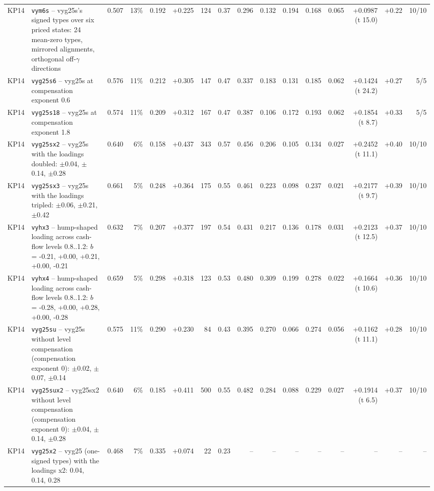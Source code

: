 \begin{landscape}
\begin{longtable}{lp{4.6cm}rrrrrrrrrrrrrr}
KP14 & \texttt{vym6s} -- vyg25s's signed types over six priced states: 24 mean-zero types, mirrored alignments, orthogonal off-$\gamma$ directions & 0.507 & 13\% & 0.192 & +0.225 & 124 & 0.37 & 0.296 & 0.132 & 0.194 & 0.168 & 0.065 & +0.0987 (t 15.0) & +0.22 & 10/10 \\
KP14 & \texttt{vyg25s6} -- vyg25s at compensation exponent 0.6 & 0.576 & 11\% & 0.212 & +0.305 & 147 & 0.47 & 0.337 & 0.183 & 0.131 & 0.185 & 0.062 & +0.1424 (t 24.2) & +0.27 & 5/5 \\
KP14 & \texttt{vyg25s18} -- vyg25s at compensation exponent 1.8 & 0.574 & 11\% & 0.209 & +0.312 & 167 & 0.47 & 0.387 & 0.106 & 0.172 & 0.193 & 0.062 & +0.1854 (t 8.7) & +0.33 & 5/5 \\
KP14 & \texttt{vyg25sx2} -- vyg25s with the loadings doubled: $\pm$0.04, $\pm$0.14, $\pm$0.28 & 0.640 & 6\% & 0.158 & +0.437 & 343 & 0.57 & 0.456 & 0.206 & 0.105 & 0.134 & 0.027 & +0.2452 (t 11.1) & +0.40 & 10/10 \\
KP14 & \texttt{vyg25sx3} -- vyg25s with the loadings tripled: $\pm$0.06, $\pm$0.21, $\pm$0.42 & 0.661 & 5\% & 0.248 & +0.364 & 175 & 0.55 & 0.461 & 0.223 & 0.098 & 0.237 & 0.021 & +0.2177 (t 9.7) & +0.39 & 10/10 \\
KP14 & \texttt{vyhx3} -- hump-shaped loading across cash-flow levels 0.8..1.2: $b$ = -0.21, +0.00, +0.21, +0.00, -0.21 & 0.632 & 7\% & 0.207 & +0.377 & 197 & 0.54 & 0.431 & 0.217 & 0.136 & 0.178 & 0.031 & +0.2123 (t 12.5) & +0.37 & 10/10 \\
KP14 & \texttt{vyhx4} -- hump-shaped loading across cash-flow levels 0.8..1.2: $b$ = -0.28, +0.00, +0.28, +0.00, -0.28 & 0.659 & 5\% & 0.298 & +0.318 & 123 & 0.53 & 0.480 & 0.309 & 0.199 & 0.278 & 0.022 & +0.1664 (t 10.6) & +0.36 & 10/10 \\
KP14 & \texttt{vyg25su} -- vyg25s without level compensation (compensation exponent 0): $\pm$0.02, $\pm$0.07, $\pm$0.14 & 0.575 & 11\% & 0.290 & +0.230 & 84 & 0.43 & 0.395 & 0.270 & 0.066 & 0.274 & 0.056 & +0.1162 (t 11.1) & +0.28 & 10/10 \\
KP14 & \texttt{vyg25sux2} -- vyg25sx2 without level compensation (compensation exponent 0): $\pm$0.04, $\pm$0.14, $\pm$0.28 & 0.640 & 6\% & 0.185 & +0.411 & 500 & 0.55 & 0.482 & 0.284 & 0.088 & 0.229 & 0.027 & +0.1914 (t 6.5) & +0.37 & 10/10 \\
KP14 & \texttt{vyg25x2} -- vyg25 (one-signed types) with the loadings x2: 0.04, 0.14, 0.28 & 0.468 & 7\% & 0.335 & +0.074 & 22 & 0.23 & -- & -- & -- & -- & -- & -- & -- & -- \\

\end{longtable}
\end{landscape}
